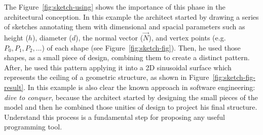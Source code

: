 The Figure~\ref{fig:sketch-using} shows the importance of this phase in the architectural conception. In this example the architect started by drawing a series of  sketches annotating them with dimensional and spacial parameters such as height ($h$), diameter ($d$), the normal vector ($\vec{N}$), and vertex points (e.g. $P_0, P_1, P_2, ...$) of each shape (see Figure~\ref{fig:sketch-fig}). Then, he used those shapes, as a small piece of design, combining them to create a distinct pattern. After, he used this pattern applying it into a 2D sinusoidal surface which represents the ceiling of a geometric structure, as shown in Figure~\ref{fig:sketch-fig-result}. In this example is also clear the known approach in software engineering: \textit{dive to conquer}, because the architect started by designing the small pieces of the model and then he combined those unities of design to project his final structure. Understand this process is a fundamental step for proposing any useful programming tool.

